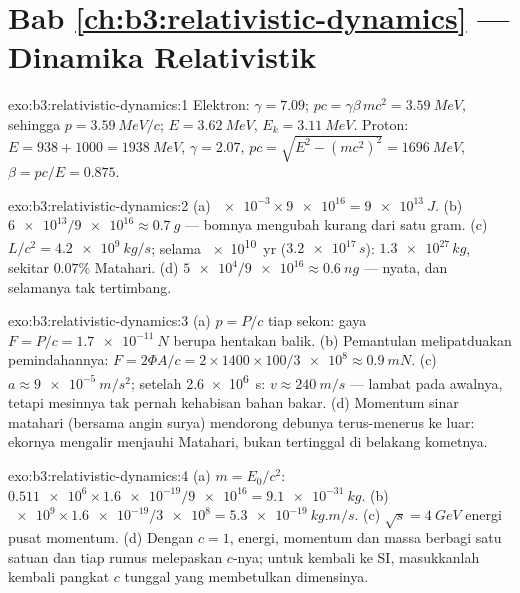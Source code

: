 \section*{Bab \ref{ch:b3:relativistic-dynamics} --- Dinamika Relativistik}

\begin{solution}{exo:b3:relativistic-dynamics:1}
Elektron: $\gamma = 7.09$; $pc = \gamma\beta\,mc^2 = \qty{3.59}{MeV}$,
sehingga $p = \qty{3.59}{MeV}/c$; $E = \qty{3.62}{MeV}$, $E_k =
\qty{3.11}{MeV}$. Proton: $E = 938 + 1000 = \qty{1938}{MeV}$, $\gamma
= 2.07$, $pc = \sqrt{E^2 - (mc^2)^2} = \qty{1696}{MeV}$, $\beta =
pc/E = 0.875$.
\end{solution}

\begin{solution}{exo:b3:relativistic-dynamics:2}
(a) $\num{e-3} \times \num{9e16} = \qty{9e13}{J}$. (b) $\num{6e13}/
\num{9e16} \approx \qty{0.7}{g}$ --- bomnya mengubah kurang dari satu
gram. (c) $L/c^2 = \qty{4.2e9}{kg/s}$; selama \qty{e10}{yr}
($\num{3.2e17}{}\,\unit{s}$): $\num{1.3e27}{}\,\unit{kg}$, sekitar
$0.07\%$ Matahari. (d) $\num{5e4}/\num{9e16} \approx
\qty{0.6}{ng}$ --- nyata, dan selamanya tak tertimbang.
\end{solution}

\begin{solution}{exo:b3:relativistic-dynamics:3}
(a) $p = P/c$ tiap sekon: gaya $F = P/c = \qty{1.7e-11}{N}$ berupa
hentakan balik. (b) Pemantulan melipatduakan pemindahannya: $F = 2\Phi A/c =
2 \times 1400 \times 100/\num{3e8} \approx \qty{0.9}{mN}$. (c) $a
\approx \qty{9e-5}{m/s^2}$; setelah \qty{2.6e6}{s}: $v \approx
\qty{240}{m/s}$ --- lambat pada awalnya, tetapi mesinnya tak pernah
kehabisan bahan bakar. (d) Momentum sinar matahari (bersama angin
surya) mendorong debunya terus-menerus ke luar: ekornya mengalir
menjauhi Matahari, bukan tertinggal di belakang kometnya.
\end{solution}

\begin{solution}{exo:b3:relativistic-dynamics:4}
(a) $m = E_0/c^2$: $\num{0.511e6} \times \num{1.6e-19}/\num{9e16} =
\qty{9.1e-31}{kg}$. (b) $\num{e9} \times \num{1.6e-19}/\num{3e8} =
\qty{5.3e-19}{kg.m/s}$. (c) $\sqrt s = \qty{4}{GeV}$ energi pusat
momentum. (d) Dengan $c = 1$, energi, momentum dan massa berbagi satu
satuan dan tiap rumus melepaskan $c$-nya; untuk kembali ke SI,
masukkanlah kembali pangkat $c$ tunggal yang membetulkan dimensinya.
\end{solution}

